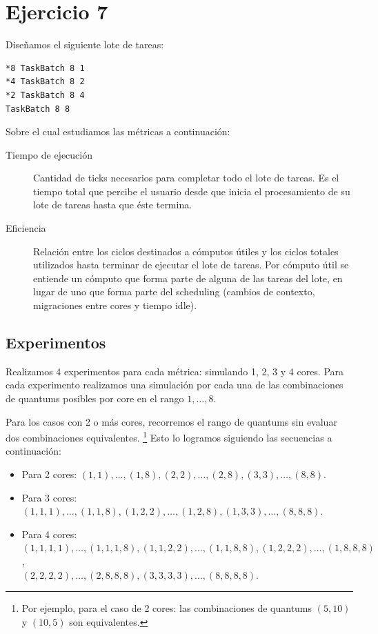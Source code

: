 \documentclass[a4paper,10pt,twoside]{article}
\begin{document}


\section{Ejercicio 7}

Diseñamos el siguiente lote de tareas:

\begin{verbatim}
*8 TaskBatch 8 1
*4 TaskBatch 8 2
*2 TaskBatch 8 4
TaskBatch 8 8
\end{verbatim}

Sobre el cual estudiamos las métricas a continuación:

\begin{description}
	\item[Tiempo de ejecución]
	Cantidad de ticks necesarios para completar todo el lote de tareas. Es el tiempo total que percibe el usuario desde que inicia el procesamiento de su lote de tareas hasta que éste termina.

	\item[Eficiencia]
	Relación entre los ciclos destinados a cómputos útiles y los ciclos totales utilizados hasta terminar de ejecutar el lote de tareas. Por cómputo útil se entiende un cómputo que forma parte de alguna de las tareas del lote, en lugar de uno que forma parte del scheduling (cambios de contexto, migraciones entre cores y tiempo idle).
\end{description}


\subsection{Experimentos}

Realizamos 4 experimentos para cada métrica: simulando 1, 2, 3 y 4 cores. Para cada experimento realizamos una simulación por cada una de las combinaciones de quantums posibles por core en el rango $1, \ldots, 8$.

Para los casos con 2 o más cores, recorremos el rango de quantums sin evaluar dos combinaciones equivalentes. \footnote{Por ejemplo, para el caso de 2 cores: las combinaciones de quantums $(5, 10)$ y $(10, 5)$ son equivalentes.} Esto lo logramos siguiendo las secuencias a continuación:

\begin{itemize}
	\item{
		Para 2 cores:
		$(1, 1), \ldots, (1, 8),
		 (2, 2), \ldots, (2, 8),
		 (3, 3), \ldots, (8, 8)$.
	}
	\item{
		Para 3 cores:
		$(1, 1, 1), \ldots, (1, 1, 8),
		 (1, 2, 2), \ldots, (1, 2, 8),
		 (1, 3, 3), \ldots, (8, 8, 8)$.
	}	
	\item{
		Para 4 cores:
		$(1, 1, 1, 1), \ldots, (1, 1, 1, 8),
		 (1, 1, 2, 2), \ldots, (1, 1, 8, 8),
		 (1, 2, 2, 2), \ldots, (1, 8, 8, 8)$, \\
		\hspace*{5.7em}
		$(2, 2, 2, 2), \ldots, (2, 8, 8, 8),
		 (3, 3, 3, 3), \ldots, (8, 8, 8, 8)$.
	}
\end{itemize}
\end{document}
